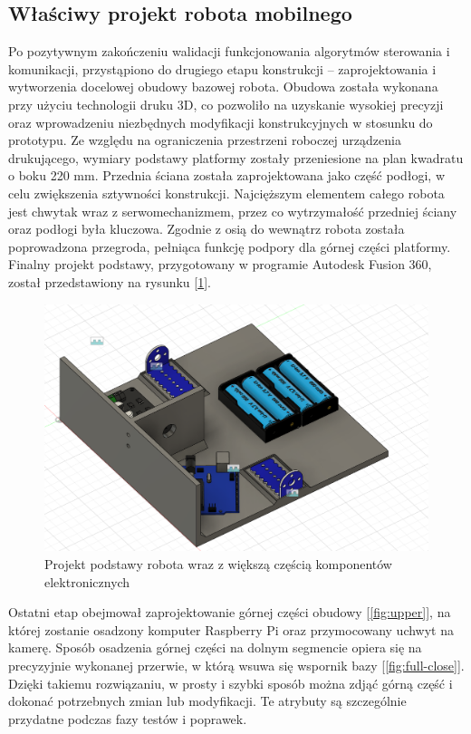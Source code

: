 \subsection{Właściwy projekt robota mobilnego}

Po pozytywnym zakończeniu walidacji funkcjonowania algorytmów sterowania i komunikacji, przystąpiono do drugiego etapu konstrukcji – zaprojektowania i wytworzenia docelowej obudowy bazowej robota. Obudowa została wykonana przy użyciu technologii druku 3D, co pozwoliło na uzyskanie wysokiej precyzji oraz wprowadzeniu niezbędnych modyfikacji konstrukcyjnych w stosunku do prototypu. Ze względu na ograniczenia przestrzeni roboczej urządzenia drukującego, wymiary podstawy platformy zostały przeniesione na plan kwadratu o boku 220 mm.
Przednia ściana została zaprojektowana jako część podłogi, w celu zwiększenia sztywności konstrukcji. Najcięższym elementem całego robota jest chwytak wraz z serwomechanizmem, przez co wytrzymałość przedniej ściany oraz podłogi była kluczowa. Zgodnie z osią do wewnątrz robota została poprowadzona przegroda, pełniąca funkcję podpory dla górnej części platformy.
Finalny projekt podstawy, przygotowany w programie Autodesk Fusion 360, został przedstawiony na rysunku [\ref{fig:base-full}].


\begin{figure}[H]
  \centering
  \includegraphics[width=1.0\textwidth]{./graf/base-full.png}
  \caption{Projekt podstawy robota wraz z większą częścią komponentów elektronicznych}
  \label{fig:base-full}
\end{figure}

Ostatni etap obejmował zaprojektowanie górnej części obudowy [\ref{fig:upper}], na której zostanie osadzony komputer Raspberry Pi oraz przymocowany uchwyt na kamerę. Sposób osadzenia górnej części na dolnym segmencie opiera się na precyzyjnie wykonanej przerwie, w którą wsuwa się wspornik bazy [\ref{fig:full-close}]. Dzięki takiemu rozwiązaniu, w prosty i szybki sposób można zdjąć górną część i dokonać potrzebnych zmian lub modyfikacji. Te atrybuty są szczególnie przydatne podczas fazy testów i poprawek.

